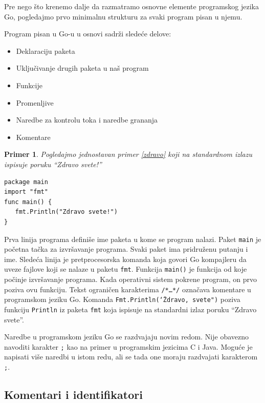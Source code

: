 \documentclass[a4paper]{article}
\newtheorem{primer}{Primer}[section]
\begin{document}
Pre nego što krenemo dalje da razmatramo osnovne elemente programskog jezika Go, pogledajmo prvo minimalnu strukturu za svaki program pisan u njemu.

Program pisan u Go-u u osnovi sadrži sledeće delove:
\begin{itemize}
\item Deklaraciju paketa
\item Uključivanje drugih paketa u naš program
\item Funkcije
\item Promenljive
\item Naredbe za kontrolu toka i naredbe grananja
\item Komentare
\end{itemize}

\begin{primer}
Pogledajmo jednostavan primer \ref{zdravo} koji na standardnom izlazu ispisuje poruku “Zdravo svete!”

\end{primer}
\begin{lstlisting}[caption={Zdravo svete},frame=single, label=zdravo]
package main
import "fmt"
func main() {
   fmt.Println("Zdravo svete!")
}
\end{lstlisting}

Prva linija programa definiše ime paketa u kome se program nalazi. Paket \texttt{main} je početna tačka za izvršavanje programa. Svaki paket ima pridruženu putanju i ime.
Sledeća linija je pretprocesorska komanda koja govori Go kompajleru da uveze fajlove koji se nalaze u paketu \texttt{fmt}.
Funkcija \texttt{main()} je funkcija od koje počinje izvršavanje programa. Kada operativni sistem pokrene program, on prvo poziva ovu funkciju.
Tekst ograničen karakterima \texttt{/*…*/} označava komentare u programskom jeziku Go. 
Komanda \texttt{Fmt.Println(\char`\"Zdravo, svete")} poziva funkciju \texttt{Println} iz paketa \texttt{fmt} koja ispisuje na standardni izlaz poruku “Zdravo svete”.

Naredbe u programskom jeziku Go se razdvajaju novim redom. Nije obavezno navoditi karakter \texttt{;} kao na primer u programskim jezicima C i Java. Moguće je napisati više naredbi u istom redu, ali se tada one moraju razdvajati karakterom \texttt{;}.

\subsection{Komentari i identifikatori}
\label{subsec:komentari_i_identifikatori}
\end{document}
